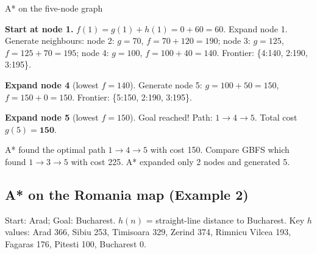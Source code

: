 \documentclass[a4paper,11pt]{article}
\begin{document}
\begin{worked}{A* on the five-node graph}
\begin{steps}
  \item \textbf{Start at node 1.}
        $f(1) = g(1)+h(1) = 0+60 = 60$.
        Expand node 1. Generate neighbours:
        node 2: $g=70$, $f=70+120=190$;
        node 3: $g=125$, $f=125+70=195$;
        node 4: $g=100$, $f=100+40=140$.
        Frontier: \{4:140, 2:190, 3:195\}.
  \item \textbf{Expand node 4} (lowest $f=140$).
        Generate node 5: $g=100+50=150$, $f=150+0=150$.
        Frontier: \{5:150, 2:190, 3:195\}.
  \item \textbf{Expand node 5} (lowest $f=150$). Goal reached!
        Path: $1 \to 4 \to 5$. Total cost $g(5) = \mathbf{150}$.
\end{steps}
A* found the optimal path $1\to4\to5$ with cost 150. Compare GBFS which
found $1\to3\to5$ with cost 225. A* expanded only 2 nodes and generated 5.
\end{worked}

\subsection*{A* on the Romania map (Example 2)}

Start: Arad; Goal: Bucharest. $h(n)$ = straight-line distance to Bucharest.
Key $h$ values: Arad 366, Sibiu 253, Timisoara 329, Zerind 374,
Rimnicu Vilcea 193, Fagaras 176, Pitesti 100, Bucharest 0.
\end{document}
